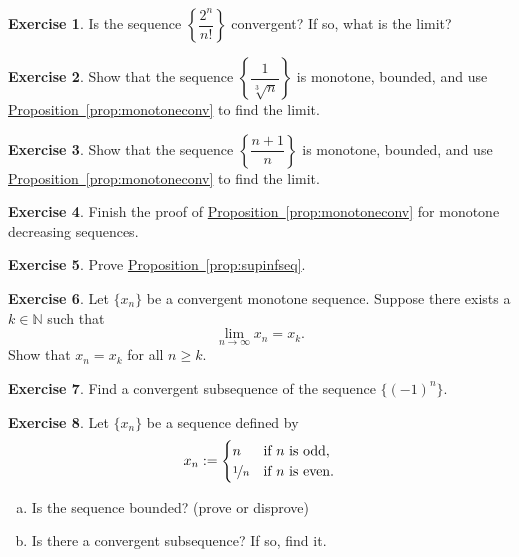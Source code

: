 \documentclass[12pt]{book}
\newcommand{\N}{{\mathbb{N}}}
\theoremstyle{plain}
\theoremstyle{remark}
\theoremstyle{definition}
\theoremstyle{exercise}
\newtheorem{exercise}{Exercise}[section]
\theoremstyle{example}
\newcommand{\propref}[1]{\hyperref[#1]{Proposition~\ref*{#1}}}
\begin{document}
\begin{exercise}
Is the sequence
$\left\{ \dfrac{2^n}{n!} \right\}$
convergent?  If so, what is the limit?
\end{exercise}

\begin{exercise}
Show that the sequence
$\left\{ \dfrac{1}{\sqrt[3]{n}} \right\}$ is monotone, bounded, and use
\propref{prop:monotoneconv} to find the limit.
\end{exercise}

\begin{exercise}
Show that the sequence
$\left\{ \dfrac{n+1}{n} \right\}$
is monotone, bounded, and use
\propref{prop:monotoneconv} to find the limit.
\end{exercise}

\begin{exercise}
Finish the proof of \propref{prop:monotoneconv} for monotone decreasing
sequences.
\end{exercise}

\begin{exercise}
Prove \propref{prop:supinfseq}.
\end{exercise}

\begin{exercise}
Let $\{ x_n \}$ be a convergent monotone sequence.  Suppose 
there exists a $k \in \N$ such that
\begin{equation*}
\lim_{n\to \infty} x_n = x_k .
\end{equation*}
Show that $x_n = x_k$ for all $n \geq k$.
\end{exercise}

\begin{exercise}
Find a convergent subsequence of the sequence
$\{ {(-1)}^n \}$.
\end{exercise}

\begin{exercise}
Let $\{x_n\}$ be a sequence defined by
\begin{equation*}
x_n := 
\begin{cases}
n & \text{if $n$ is odd} , \\
\nicefrac{1}{n} & \text{if $n$ is even} .
\end{cases}
\end{equation*}
\begin{enumerate}[a)]
\item Is the sequence bounded? (prove or disprove)
\item Is there a convergent subsequence?  If so, find it.
\end{enumerate}
\end{exercise}
\end{document}
